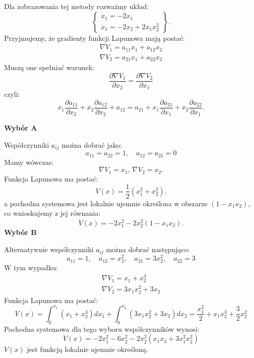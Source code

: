 \documentclass{article}
\begin{document}
        \begin{tcolorbox}[colback=green!5, colframe=green!75!black, title=Przykład]
        Dla zobrazowania tej metody rozważmy układ:
        $$
            \left\{
            \begin{array}{l}
                 \dot{x}_{1} = -2x_{1}\\
                 \dot{x}_{1} = -2x_{2} + 2x_{1}x_{2}^{2}
            \end{array}
            \right\}.
        $$
        Przyjmujemy, że gradienty funkcji Lapunowa mają postać:
        $$
            \begin{array}{l}
                 \nabla V_{1} = a_{11}x_{1} + a_{12}x_{2}\\
                 \nabla V_{2} = a_{21}x_{1} + a_{22}x_{2}
            \end{array}
        $$
        Muszą one spełniać warunek:
        $$
            \frac{\partial \nabla V_{1}}{\partial x_{2}} = \frac{\partial \nabla V_{2}}{\partial x_{1}}
        $$
        czyli:
        $$
            x_{1}\frac{\partial a_{11}}{\partial x_{2}} + x_{2}\frac{\partial a_{12}}{\partial x_{2}} +a_{12} = a_{21} + x_{1}\frac{\partial a_{21}}{\partial x_{1}} +x_{2}\frac{\partial a_{22}}{\partial x_{1}}.
        $$
        
        \textbf{Wybór A}

        Współczynniki $a_{ij}$ można dobrać jako:
        $$
            a_{11} = a_{22} = 1, \quad a_{12}=a_{21}=0
        $$
        Mamy wówczas:
        $$
            \nabla V_{1} = x_{1},\,\nabla V_{2} = x_{2}.
        $$
        Funkcja Lapunowa ma postać:
        $$
            V(x) = \frac{1}{2}(x_{1}^{2} + x_{2}^{2}).
        $$
        a pochodna systemowa jest lokalnie ujemnie określona w obszarze $(1-x_1x_2)$, co wnioskujemy z jej równania:
        $$
            \dot{V}(x) = -2x_{1}^{2} - 2x_{2}^{2}(1-x_{1}x_{2}).
        $$
        \textbf{Wybór B}

        Alternatywnie współczynniki $a_{ij}$ można dobrać następująco:
        $$
            a_{11} = 1, \quad a_{12} = x_2^2, \quad a_{21} = 3x_2^2, \quad a_{22}=3
        $$
        W tym wypadku:
         $$
            \begin{array}{l}
                 \nabla V_{1} = x_{1} + x_2^3\\
                 \nabla V_{2} = 3x_{1}x_2^2 + 3x_{2}
            \end{array}
        $$
        Funkcja Lapunowa ma postać:
        $$
                V(x) = \int_{0}^{x_{1}}{(x_{1} + x_2^3)dx_1} + \int_{0}^{x_{2}}{(3x_{1}x_2^2 + 3x_{2})dx_2} = \frac{x_1^2}{2}+x_1x_2^3+\frac{3}{2}x_2^2
        $$
        Pochodna systemowa dla tego wyboru współczynników wynosi:
        $$
            \dot{V}(x) = -2x_1^2 - 6x_2^2 -2x_2^2(x_1x_2+3x_1^2x_2^2)
        $$      
        $\dot{V}(x)$ jest funkcją lokalnie ujemnie określoną.
        

        \end{tcolorbox}
\end{document}
